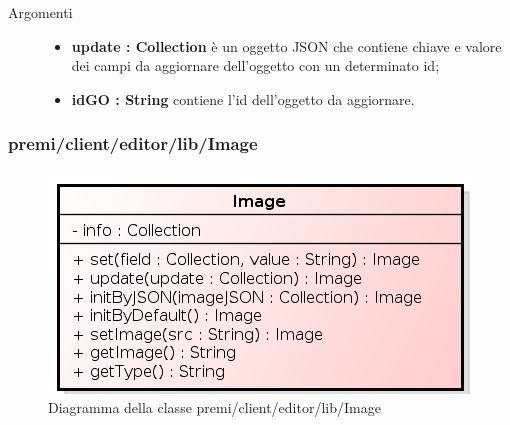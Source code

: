 \begin{description}
\begin{description}
\begin{description}
			\item[Argomenti] \hfill
				\begin{itemize}
						\item \textbf{update : Collection			} \hfill
					è un oggetto JSON che contiene chiave e valore dei campi da aggiornare dell'oggetto con un determinato id;
					\item \textbf{idGO : String			} \hfill
					contiene l'id dell'oggetto da aggiornare.
				\end{itemize}

\end{description}

\end{description}


\end{description}

\subsubsection{premi/client/editor/lib/Image}
\begin{figure}[H]
\begin{center}
\includegraphics[scale=0.80]{img/diacla/Image.png}
\caption{Diagramma della classe premi/client/editor/lib/Image}
\end{center}
\end{figure}


